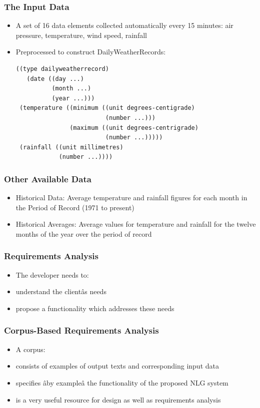 \documentclass[compress,color=usenames]{beamer}
\begin{document}
\begin{frame}[fragile]
\frametitle{The Input Data}

\begin{itemize}
\item { {A set of 16 data elements collected automatically every 15 minutes: air pressure, temperature, wind speed, rainfall }}
\item { {Preprocessed to construct DailyWeatherRecords:}}

\begin{verbatim}
((type dailyweatherrecord)
   (date ((day ...)
          (month ...)
          (year ...)))
 (temperature ((minimum ((unit degrees-centigrade)
                         (number ...)))
               (maximum ((unit degrees-centrigrade)
                         (number ...)))))
 (rainfall ((unit millimetres)
            (number ...))))
\end{verbatim}

\end{itemize}
\end{frame}

\begin{frame}
\frametitle{Other Available Data}

\label{f74}
\begin{itemize}
\item { {Historical Data: Average temperature and rainfall figures for each month in the Period of Record (1971 to present)}}
\item { {Historical Averages: Average values for temperature and rainfall for the twelve months of the year over the period of record}}
\end{itemize}

\end{frame}

\begin{frame}
\frametitle{Requirements Analysis}

\label{f76}
\begin{itemize}
\item { {The developer needs to:}}
\item { {understand the client\^as needs}}
\item { {propose a functionality which addresses these needs}}
\end{itemize}

\end{frame}

\begin{frame}
\frametitle{Corpus-Based Requirements Analysis}

\label{f78}
\begin{itemize}
\item { {A corpus:}}
\item { {consists of examples of output texts and corresponding input data}}
\item { {specifies \^aby example\^a the functionality of the proposed NLG system}}
\item { {is a very useful resource for design as well as requirements analysis}}
\end{itemize}

\end{frame}
\end{document}
